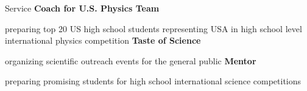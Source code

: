 \begin{rubric}{Service}
%
\entry*[\hspace{1.7cm} ]%
  \textbf{Coach for U.S. Physics Team}
  \par preparing top 20 US high school students representing USA in high school level international physics competition
%
\entry*[\hfill]%
  \textbf{Taste of Science} 
  \par organizing scientific outreach events
for the general public
%
\entry*[\hfill]%
  \textbf{Mentor}
  \par preparing promising students for high school international science competitions 
\end{rubric}
